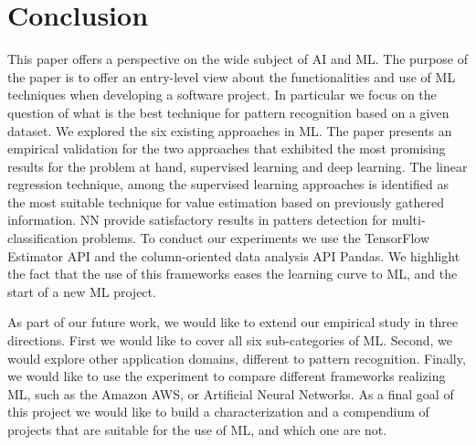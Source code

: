 
\section{Conclusion}
\label{sec:conclusion}

This paper offers a perspective on the wide subject of \ac{AI} and \ac{ML}. The purpose of the paper 
is to offer an entry-level view about the functionalities and use of \ac{ML} techniques when developing 
a software project. In particular 
we focus on the question of what is the best technique for pattern recognition based on a given 
dataset. We explored the six existing approaches in \ac{ML}. The paper presents an empirical 
validation for the two approaches that exhibited the most promising results for the problem at hand, 
supervised learning and deep learning. The linear regression technique, among the supervised 
learning approaches is identified as the most suitable technique for value estimation based on 
previously gathered information. 
\acl{NN} provide satisfactory results in patters detection for multi-classification problems. 
To conduct our experiments we use the TensorFlow Estimator API and the column-oriented data 
analysis API Pandas. We highlight the fact that the use of this frameworks eases the learning curve 
to \ac{ML}, and the start of a new \ac{ML} project.

As part of our future work, we would like to extend our empirical study in three directions. First we 
would like to cover all six sub-categories of \ac{ML}. Second, we would explore other application 
domains, different to pattern recognition. Finally, we would like to use the experiment to compare 
different frameworks realizing \ac{ML}, such as the Amazon AWS, or Artificial Neural Networks. 
As a final goal of this project we would like to build a characterization and a compendium of projects 
that are suitable for the use of \ac{ML}, and which one are not.

\endinput

